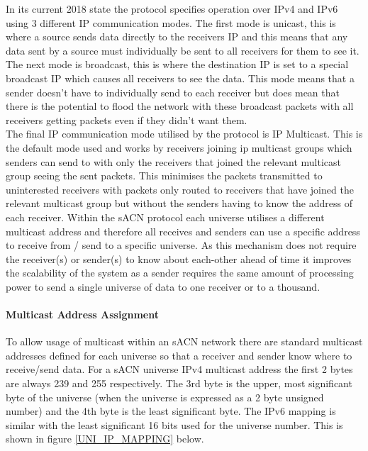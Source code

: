 \documentclass[11pt,a4paper]{article}
\begin{document}
In its current 2018 state the protocol specifies operation over IPv4 and IPv6 using 3 different IP communication modes. The first mode is unicast, this is where a source sends data directly to the receivers IP and this means that any data sent by a source must individually be sent to all receivers for them to see it. The next mode is broadcast, this is where the destination IP is set to a special broadcast IP which causes all receivers to see the data. This mode means that a sender doesn't have to individually send to each receiver but does mean that there is the potential to flood the network with these broadcast packets with all receivers getting packets even if they didn't want them.\\

The final IP communication mode utilised by the protocol is IP Multicast. This is the default mode used and works by receivers joining ip multicast groups which senders can send to with only the receivers that joined the relevant multicast group seeing the sent packets. This minimises the packets transmitted to uninterested receivers with packets only routed to receivers that have joined the relevant multicast group but without the senders having to know the address of each receiver. Within the sACN protocol each universe utilises a different multicast address and therefore all receives and senders can use a specific address to receive from / send to a specific universe. As this mechanism does not require the receiver(s) or sender(s) to know about each-other ahead of time it improves the scalability of the system as a sender requires the same amount of processing power to send a single universe of data to one receiver or to a thousand. \\

\paragraph{Multicast Address Assignment}
To allow usage of multicast within an sACN network there are standard multicast addresses defined for each universe so that a receiver and sender know where to receive/send data. For a sACN universe IPv4 multicast address the first 2 bytes are always 239 and 255 respectively. The 3rd byte is the upper, most significant byte of the universe (when the universe is expressed as a 2 byte unsigned number) and the 4th byte is the least significant byte. The IPv6 mapping is similar with the least significant 16 bits used for the universe number. This is shown in figure \ref{UNI_IP_MAPPING} below.
\end{document}
